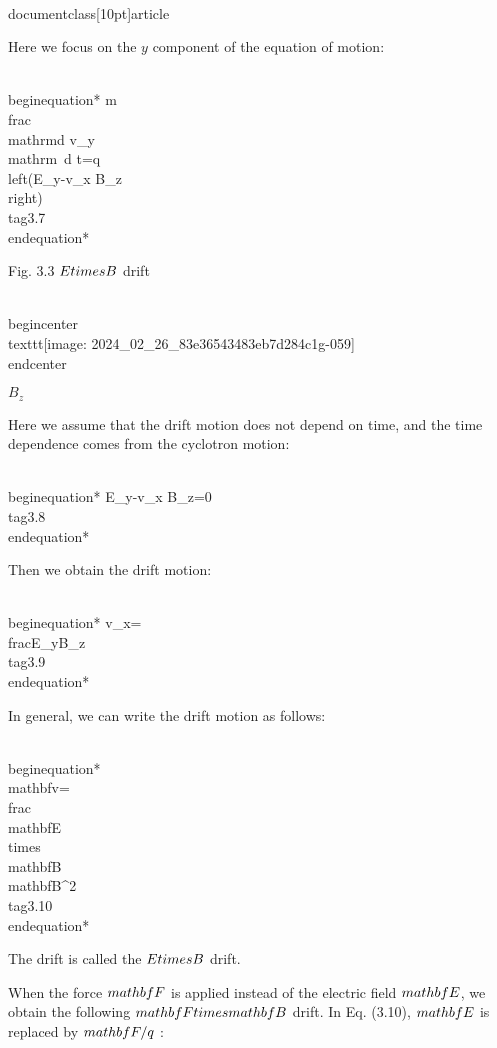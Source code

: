 \\documentclass[10pt]{article}
\begin{document}
Here we focus on the $y$ component of the equation of motion:


\\begin{equation*}
m \\frac{\\mathrm{d} v_{y}}{\\mathrm{~d} t}=q\\left(E_{y}-v_{x} B_{z}\\right) \\tag{3.7}
\\end{equation*}


Fig. 3.3 $E \\times B$ drift

\\begin{center}
\\texttt{[image: 2024\_02\_26\_83e36543483eb7d284c1g-059]}
\\end{center}

$B_{z}$

Here we assume that the drift motion does not depend on time, and the time dependence comes from the cyclotron motion:


\\begin{equation*}
E_{y}-v_{x} B_{z}=0 \\tag{3.8}
\\end{equation*}


Then we obtain the drift motion:


\\begin{equation*}
v_{x}=\\frac{E_{y}}{B_{z}} \\tag{3.9}
\\end{equation*}


In general, we can write the drift motion as follows:


\\begin{equation*}
\\mathbf{v}=\\frac{\\mathbf{E} \\times \\mathbf{B}}{\\mathbf{B}^{2}} \\tag{3.10}
\\end{equation*}


The drift is called the $E \\times B$ drift.

When the force $\\mathbf{F}$ is applied instead of the electric field $\\mathbf{E}$, we obtain the following $\\mathbf{F} \\times \\mathbf{B}$ drift. In Eq. (3.10), $\\mathbf{E}$ is replaced by $\\mathbf{F} / q$ :
\end{document}
